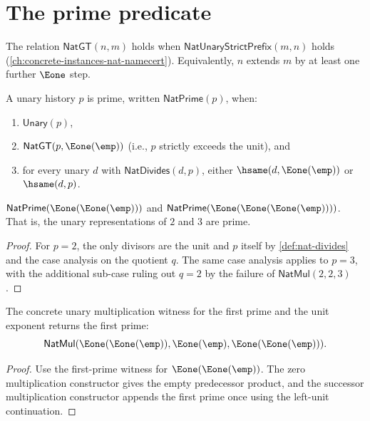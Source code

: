 \section{The prime predicate}

\begin{definition}
\label{def:nat-strict-greater}
The relation \(\mathsf{NatGT}(n, m)\) holds when \(\mathsf{NatUnaryStrictPrefix}(m, n)\) holds (\autoref{ch:concrete-instances-nat-namecert}). Equivalently, \(n\) extends \(m\) by at least one further \(\Eone\) step.
\end{definition}

\begin{definition}
\label{def:nat-prime}
A unary history \(p\) is prime, written \(\mathsf{NatPrime}(p)\), when:
\begin{enumerate}
  \item \(\mathsf{Unary}(p)\),
  \item \(\mathsf{NatGT}(p, \Eone(\emp))\) (i.e., \(p\) strictly exceeds the unit), and
  \item for every unary \(d\) with \(\mathsf{NatDivides}(d, p)\), either \(\hsame(d, \Eone(\emp))\) or \(\hsame(d, p)\).
\end{enumerate}
\end{definition}

\begin{lemma}
\label{lem:first-primes}
\(\mathsf{NatPrime}(\Eone(\Eone(\emp)))\) and \(\mathsf{NatPrime}(\Eone(\Eone(\Eone(\emp))))\). That is, the unary representations of \(2\) and \(3\) are prime.
\end{lemma}
\begin{proof}
For \(p = 2\), the only divisors are the unit and \(p\) itself by \autoref{def:nat-divides} and the case analysis on the quotient \(q\). The same case analysis applies to \(p = 3\), with the additional sub-case ruling out \(q = 2\) by the failure of \(\mathsf{NatMul}(2, 2, 3)\).
\end{proof}

\begin{lemma}
\label{lem:nat-mul-first-prime-unit-result}
The concrete unary multiplication witness for the first prime and the unit
exponent returns the first prime:
$$
\mathsf{NatMul}(\Eone(\Eone(\emp)),\Eone(\emp),\Eone(\Eone(\emp))).
$$
\end{lemma}
\begin{proof}
Use the first-prime witness for \(\Eone(\Eone(\emp))\). The zero
multiplication constructor gives the empty predecessor product, and the
successor multiplication constructor appends the first prime once using the
left-unit continuation.
\end{proof}

